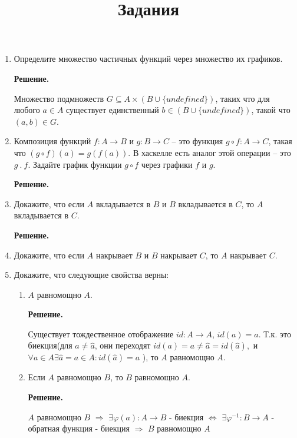 \documentclass[draft]{article}
\begin{document}
\title{Задания}
\maketitle

\begin{enumerate}

\item Определите множество частичных функций через множество их графиков.

\textbf{Решение.} 

Множество подмножеств $G \subseteq A \times (B \cup \{undefined\})$,
таких что для любого $a \in A$ существует единственный
$b \in (B \cup \{undefined\})$, такой что $(a, b) \in G$.

\item Композиция функций $f : A \to B$ и $g : B \to C$ -- это функция $g \circ f : A \to C$, 
такая что $(g \circ f)(a) = g(f(a))$.
    В хаскелле есть аналог этой операции -- это $g\ .\ f$.
    Задайте график функции $g \circ f$ через графики $f$ и $g$.

\textbf{Решение.} 


\item Докажите, что если $A$ вкладывается в $B$ и $B$ вкладывается в $C$, то $A$ вкладывается в $C$.

\textbf{Решение.} 


\item Докажите, что если $A$ накрывает $B$ и $B$ накрывает $C$, то $A$ накрывает $C$.

\item Докажите, что следующие свойства верны:
\begin{enumerate}
\item $A$ равномощно $A$.

\textbf{Решение.} 

Существует тождественное отображение $id: A\rightarrow A$, $id(a) = a$. Т.к. это биекция(для 
$a\neq \hat{a}$, они переходят $id(a) = a \neq \hat{a} = id(\hat{a}),$ и $\forall a\in A 
\exists\hat{a} = a \in A : id(\hat{a}) = a$ ), то $A$ равномощно $A$. 

\item Если $A$ равномощно $B$, то $B$ равномощно $A$.

\textbf{Решение.} 

$A$ равномощно $B$ $\Rightarrow$ $\exists \varphi(a):A\rightarrow B$ - биекция 
$\Leftrightarrow$ $\exists \varphi^{-1} : B \rightarrow A$ - обратная функция - биекция 
$\Rightarrow$ $B$ равномощно $A$ 



\end{enumerate}
\end{enumerate}
\end{document}
